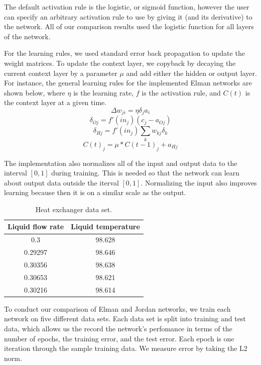 \documentclass{acm_proc_article-sp}
\begin{document}
The default activation rule is the logistic, or sigmoid function, however the user can specify an arbitrary activation rule to use by giving it (and its derivative) to the network. 
All of our comparison results used the logistic function for all layers of the network. 

For the learning rules, we used standard error back propagation to update the weight matrices. To update the context layer, we copyback by decaying the current context layer by a parameter $\mu$ and add either the hidden or output layer. For instance, the general learning rules for the implemented Elman networks are shown below, where $\eta$ is the learning rate, $f$ is the activation rule, and $C(t)$ is the context layer at a given time.
$$\Delta w_{ji} = \eta \delta_j a_i$$
$$\delta_{Oj} = f'(in_j)(c_{j}-a_{Oj})$$
$$\delta_{Hj} = f'(in_j) \sum_k w_{kj} \delta_k$$
$$C(t)_{j} = \mu * C(t-1)_j + a_{Hj}$$

The implementation also normalizes all of the input and output data to the interval $[0,1]$ during training. 
This is needed so that the network can learn about output data outside the iterval $[0,1]$. 
Normalizing the input also improves learning because then it is on a similar scale as the output. 

\begin{table}
\begin{center}
  \begin{tabular}{| c | c |}
  \hline
  \textbf{Liquid flow rate} & \textbf{Liquid temperature}\\ \hline
  0.3 & 98.628\\ \hline
  0.29297 & 98.646\\ \hline
  0.30356 & 98.638\\ \hline
  0.30653 & 98.621\\ \hline
  0.30216 & 98.614\\ \hline
  \end{tabular}
\end{center}  
  \caption{Heat exchanger data set.}
  \label{table:exchange}
\end{table}

To conduct our comparison of Elman and Jordan networks, we train each network on five different data sets. Each data set is split into training and test data, which allows us the record the network's perfomance in terms of the number of epochs, the training error, and the test error. Each epoch is one iteration through the sample training data. We measure error by taking the L2 norm.
\end{document}
